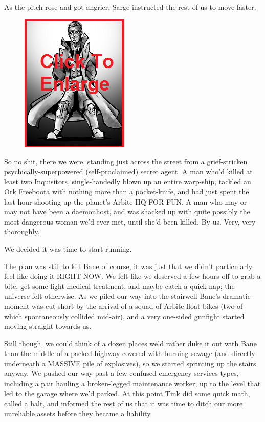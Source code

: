 As the pitch rose and got angrier, Sarge instructed the rest of us to move faster.

\begin{figure}
	\begin{center}
		\includegraphics[width=\figwidth]{pics/19/47.png}
	\end{center}
\end{figure}
So no shit, there we were, standing just across the street from a grief-stricken psychically-superpowered (self-proclaimed) secret agent. 
A man who'd killed at least two Inquisitors, single-handedly blown up an entire warp-ship, tackled an Ork Freeboota with nothing more than a pocket-knife, and had just spent the last hour shooting up the planet's Arbite HQ FOR FUN. 
A man who may or may not have been a daemonhost, and was shacked up with quite possibly the most dangerous woman we'd ever met, until she'd been killed. 
By us. 
Very, very thoroughly.

We decided it was time to start running.

The plan was still to kill Bane of course, it was just that we didn't particularly feel like doing it RIGHT NOW. 
We felt like we deserved a few hours off to grab a bite, get some light medical treatment, and maybe catch a quick nap; 
the universe felt otherwise. 
As we piled our way into the stairwell Bane's dramatic moment was cut short by the arrival of a squad of Arbite float-bikes (two of which spontaneously collided mid-air), and a very one-sided gunfight started moving straight towards us. 


Still though, we could think of a dozen places we'd rather duke it out with Bane than the middle of a packed highway covered with burning sewage (and directly underneath a MASSIVE pile of explosives), so we started sprinting up the stairs anyway. 
We pushed our way past a few confused emergency services types, including a pair hauling a broken-legged maintenance worker, up to the level that led to the garage where we'd parked. 
At this point Tink did some quick math, called a halt, and informed the rest of us that it was time to ditch our more unreliable assets before they became a liability.

